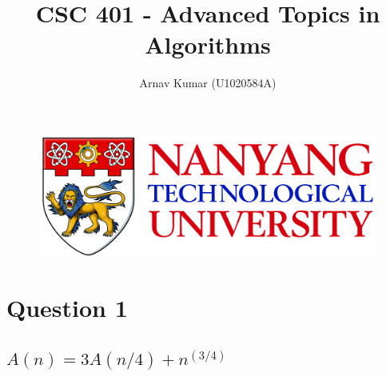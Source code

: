 \documentclass{article}
\begin{document}
\begin{figure}[t]
\includegraphics[width=\linewidth]{images/NTULogo}
\end{figure}
\title{CSC 401 - Advanced Topics in Algorithms}
\author{Arnav Kumar (U1020584A)}

\maketitle

\newpage
\section{Question 1}

\subsection{$A(n) = 3A(n/4) + n^{(3/4)}$}
\end{document}
